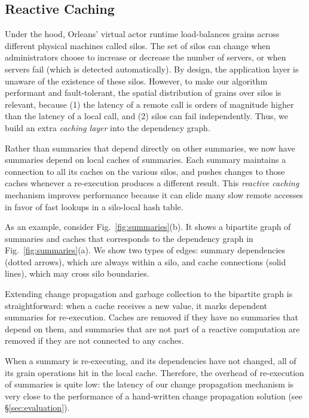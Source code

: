 \subsection{Reactive Caching}\label{sec:bp}

Under the hood, Orleans' virtual actor runtime load-balances grains across different physical machines called silos. The set of silos can change when administrators choose to increase or decrease the number of servers, or when servers fail (which is detected automatically). By design, the application layer is unaware of the existence of these silos. However, to make our algorithm performant and fault-tolerant, the spatial distribution of grains over silos is relevant, because (1) the latency of a remote call is orders of magnitude higher than the latency of a local call, and (2) silos can fail independently. Thus, we build an extra \emph{caching layer} into the dependency graph.

Rather than summaries that depend directly on other summaries, we now have summaries depend on local caches of summaries. Each summary maintains a connection to all its caches on the various silos, and pushes changes to those caches whenever a re-execution produces a different result. This \emph{reactive caching} mechanism improves performance because it can elide many slow remote accesses in favor of fast lookups in a silo-local hash table.

As an example, consider Fig.~\ref{fig:summaries}(b). It shows a bipartite graph of summaries and caches that corresponds to the dependency graph in Fig.~\ref{fig:summaries}(a). We show two types of edges: summary dependencies (dotted arrows), which are always within a silo, and cache connections (solid lines), which may cross silo boundaries. 

Extending change propagation and garbage collection to the bipartite graph is straightforward: when a cache receives a new value, it marks dependent summaries for re-execution. Caches are removed if they have no summaries that depend on them, and summaries that are not part of a reactive computation are removed if they are not connected to any caches. 

 When a summary is re-executing, and its dependencies have not changed, all of its grain operations hit in the local cache. Therefore, the overhead of re-execution of summaries is quite low: the latency of our change propagation mechanism is very close to the performance of a hand-written change propagation solution (see \S\ref{sec:evaluation}).

